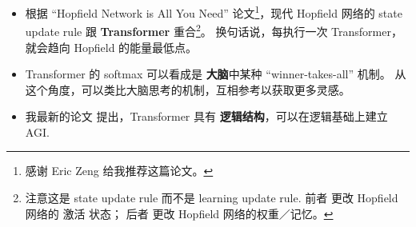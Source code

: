 \begin{preview}
\begin{minipage}{\textwidth}
\begin{itemize}
	\item 根据 ``Hopfield Network is All You Need'' 论文\footnote{感谢 Eric Zeng 给我推荐这篇论文。}，现代 Hopfield 网络的 state update rule 跟 \textbf{Transformer} 重合\footnote{注意这是 state update rule 而不是 learning update rule.  前者 更改 Hopfield 网络的 激活 状态； 后者 更改 Hopfield 网络的权重／记忆。}。 换句话说，每执行一次 Transformer，就会趋向 Hopfield 的能量最低点。 

	\item Transformer 的 softmax 可以看成是 \textbf{大脑}中某种 ``winner-takes-all'' 机制。 从这个角度，可以类比大脑思考的机制，互相参考以获取更多灵感。
	
	\item 我最新的论文 提出，Transformer 具有 \textbf{逻辑结构}，可以在逻辑基础上建立 AGI.

\end{itemize}


\end{minipage}
\end{preview}

